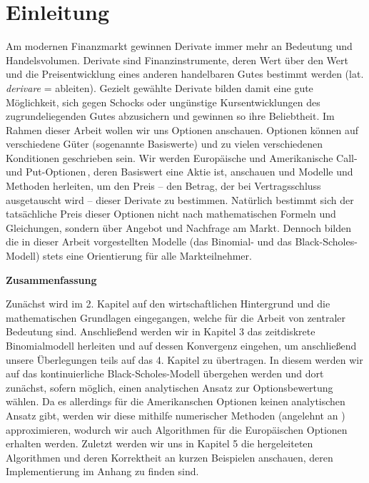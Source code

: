 
\chapter{Einleitung}


Am modernen Finanzmarkt gewinnen Derivate immer mehr an Bedeutung und Handelsvolumen. Derivate sind Finanzinstrumente, deren Wert über den Wert und die Preisentwicklung eines anderen handelbaren Gutes bestimmt werden (lat. \textit{derivare} = \glqq ableiten\grqq). Gezielt gewählte Derivate bilden damit eine gute Möglichkeit, sich gegen Schocks oder ungünstige Kursentwicklungen des zugrundeliegenden Gutes abzusichern und gewinnen so ihre Beliebtheit.
Im Rahmen dieser Arbeit wollen wir uns Optionen anschauen. Optionen können auf verschiedene Güter (sogenannte Basiswerte) und zu vielen verschiedenen Konditionen geschrieben sein. Wir werden \glqq Europäische und Amerikanische Call- und Put-Optionen\grqq\,, deren Basiswert eine Aktie ist, anschauen und Modelle und Methoden herleiten, um den Preis -- den Betrag, der bei Vertragsschluss ausgetauscht wird -- dieser Derivate zu bestimmen. Natürlich bestimmt sich der tatsächliche Preis dieser Optionen nicht nach mathematischen Formeln und Gleichungen, sondern über Angebot und Nachfrage am Markt. Dennoch bilden die in dieser Arbeit vorgestellten Modelle (das Binomial- und das Black-Scholes-Modell) stets eine Orientierung für alle Markteilnehmer.

\vspace{0.8cm}
{\large\bf{Zusammenfassung}}

Zunächst wird im 2. Kapitel auf den wirtschaftlichen Hintergrund und die mathematischen Grundlagen eingegangen, welche für die Arbeit von zentraler Bedeutung sind. Anschließend werden wir in Kapitel 3 das zeitdiskrete Binomialmodell herleiten und auf dessen Konvergenz eingehen, um anschließend unsere Überlegungen teils auf das 4. Kapitel zu übertragen. In diesem werden wir auf das kontinuierliche Black-Scholes-Modell übergehen werden und dort zunächst, sofern möglich, einen analytischen Ansatz zur Optionsbewertung wählen. Da es allerdings für die Amerikanschen Optionen keinen analytischen Ansatz gibt, werden wir diese mithilfe numerischer Methoden (angelehnt an \cite{GuentherJuengel}) approximieren, wodurch wir auch Algorithmen für die Europäischen Optionen erhalten werden. Zuletzt werden wir uns in Kapitel 5 die hergeleiteten Algorithmen und deren Korrektheit an kurzen Beispielen anschauen, deren Implementierung im Anhang zu finden sind.